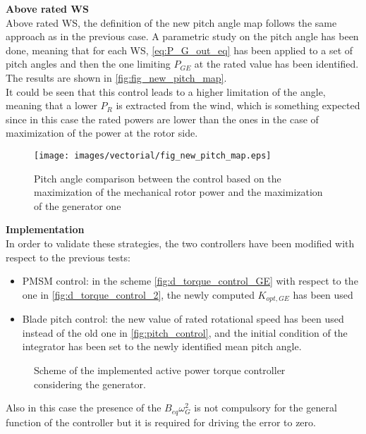 \textbf{Above rated WS}\\
Above rated WS, the definition of the new pitch angle map follows the same approach as in the previous case. A parametric study on the pitch angle has been done, meaning that for each WS, \autoref{eq:P_G_out_eq} has been applied to a set of pitch angles and then the one limiting $P_{GE}$ at the rated value has been identified. The results are shown in \autoref{fig:fig_new_pitch_map}.\\ 
 It could be seen that this control leads to a higher limitation of the angle, meaning that a lower $P_R$ is extracted from the wind, which is something expected since in this case the rated powers are lower than the ones in the case of maximization of the power at the rotor side.
\begin{figure}[H]
  \centering
  \texttt{[image: images/vectorial/fig\_new\_pitch\_map.eps]}
  \caption{Pitch angle comparison between the control based on the maximization of the mechanical rotor power and the maximization of the generator one}
  \label{fig:fig_new_pitch_map}
\end{figure}

\textbf{Implementation}\\
In order to validate these strategies, the two controllers have been modified with respect to the previous tests:
\begin{itemize}
  \item PMSM control: in the scheme \autoref{fig:d_torque_control_GE} with respect to the one in \autoref{fig:d_torque_control_2}, the newly computed  $K_{opt,GE}$ has been used%
  \item Blade pitch control: the new value of rated rotational speed has been used instead of the old one in \autoref{fig:pitch_control}, and the initial condition of the integrator has been set to the newly identified mean pitch angle.
\end{itemize}

\begin{figure}[H]
  \centering
  
  \caption{Scheme of the implemented active power torque controller considering the generator.}
  \label{fig:d_torque_control_GE}
\end{figure}
Also in this case the presence of the $B_{eq}\omega_G^2$ is not compulsory for the general function of the controller but it is required for driving the error to zero.

